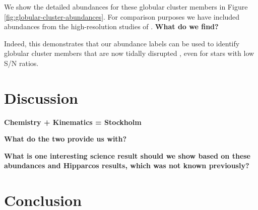 \documentclass[preprint,trackchanges]{aastex}
\newcommand{\project}[1]{\textsl{#1}}
\newcommand{\stub}[1]{{\color{blue} \textbf{#1}}}
\newcommand{\teff}{T_{\mathrm{eff}}}
\newcommand{\logg}{\log g}
\newcommand{\Nstars}{457,589}
\begin{document}
We show the detailed abundances for these globular cluster members in
Figure \ref{fig:globular-cluster-abundances}.  For comparison purposes we
have included abundances from the high-resolution studies of \citep{people}.
\stub{What do we find?}

Indeed, this demonstrates that our abundance labels can be used to identify
globular cluster members that are now tidally disrupted \citep{Anguiano_2016,Kuzma_2016,Navin_2016},
even for stars with low S/N ratios.







\section{Discussion}
\label{sec:discussion}


\stub{Chemistry + Kinematics = Stockholm}

\stub{What do the two provide us with?}

\stub{What is one interesting science result should we show based on these abundances and Hipparcos results, which was not known previously?}


\section{Conclusion}
\label{sec:conclusion}

\end{document}
